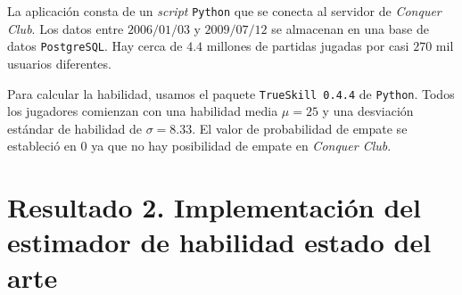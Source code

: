 \documentclass[a4paper,11pt]{book}
\theoremstyle{definition}
\begin{document}

La aplicaci\'on consta de un \emph{script} \texttt{Python} que se conecta al servidor de \emph{Conquer Club}.
%
Los datos entre $2006/01/03$ y $2009/07/12$ se almacenan en una base de datos \texttt{PostgreSQL}.
Hay cerca de $4.4$ millones de partidas jugadas por casi $270$ mil usuarios diferentes.

Para calcular la habilidad, usamos el paquete \texttt{TrueSkill 0.4.4} de \texttt{Python}.
%
Todos los jugadores comienzan con una habilidad media $\mu = 25$ y una desviaci\'on est\'andar de habilidad de $\sigma = 8.33$.
%
El valor de probabilidad de empate se estableci\'o en 0 ya que no hay posibilidad de empate en \emph{Conquer Club}.
















































































\chapter{Resultado 2. Implementaci\'on del estimador de habilidad estado del arte} \label{ch_ttt}
\end{document}
